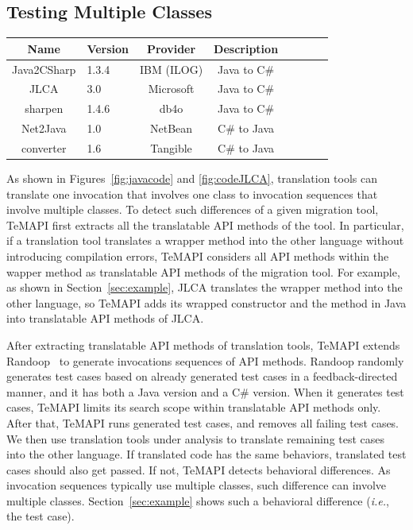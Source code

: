 \subsection{Testing Multiple Classes}
\label{sec:approach:sequence}
\begin{table}[t]
\centering
\begin{SmallOut}
\begin {tabular} {|c|l|c|c|c|c|c|c|}
 \hline
\textbf{Name}& \textbf{Version}& \textbf{Provider} &\textbf{Description}\\
\hline
Java2CSharp  &  1.3.4 & IBM (ILOG) & Java to C\# \\
\hline
JLCA         &  3.0   & Microsoft  & Java to C\# \\
\hline
sharpen      &  1.4.6 & db4o       & Java to C\# \\
\hline
Net2Java     &  1.0   & NetBean    &  C\# to Java\\
\hline
converter    &  1.6   & Tangible   &  C\# to Java\\
\hline
\end{tabular}\vspace*{-2ex}
 \label{table:subjects}
\end{SmallOut}\vspace*{-4ex}
\end{table}

As shown in Figures~\ref{fig:javacode} and \ref{fig:codeJLCA}, translation tools can translate one invocation that involves one class to invocation sequences that involve multiple classes. To detect such differences of a given migration tool, TeMAPI first extracts all the translatable API methods of the tool. In particular, if a translation tool translates a wrapper method into the other language without introducing compilation errors, TeMAPI considers all API methods within the wapper method as translatable API methods of the migration tool. For example, as shown in Section~\ref{sec:example}, JLCA translates the  wrapper method into the other language, so TeMAPI adds its wrapped  constructor and the  method in Java into translatable API methods of JLCA.

After extracting translatable API methods of translation tools, TeMAPI extends Randoop~\cite{pacheco2007feedback} to generate invocations sequences of API methods. Randoop randomly generates test cases based on already generated test cases in a feedback-directed manner, and it has both a Java version and a C\# version. When it generates test cases, TeMAPI limits its search scope within translatable API methods only. After that, TeMAPI runs generated test cases, and removes all failing test cases. We then use translation tools under analysis to translate remaining test cases into the other language. If translated code has the same behaviors, translated test cases should also get passed. If not, TeMAPI detects behavioral differences. As invocation sequences typically use multiple classes, such difference can involve multiple classes. Section~\ref{sec:example} shows such a behavioral difference (\emph{i.e.}, the  test case).


